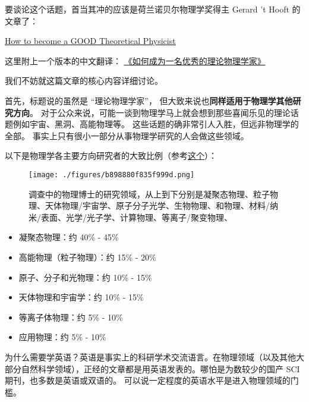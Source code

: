 
要谈论这个话题，首当其冲的应该是荷兰诺贝尔物理学奖得主 Gerard 't Hooft 的文章了：

\href{https://webspace.science.uu.nl/~hooft101/theorist.html}{How to become a GOOD Theoretical Physicist}

这里附上一个版本的中文翻译： \href{https://xialab.pku.edu.cn/kytdyw1/zdylm.m.jsp?wbtreeid=1011&tstreeid=11956&_t_uid=2945&language=en&homepageuuid=BF649325C5584FC683CE0B601D21AC65&templateuuid=4CC182410BA14FF8B55ED726FB2087FB&producttype=0&_tmode_=99&tsitesapptype=zdylm}{《如何成为一名优秀的理论物理学家》}

我们不妨就这篇文章的核心内容详细讨论。

首先，标题说的虽然是 “理论物理学家”， 但大致来说也\textbf{同样适用于物理学其他研究方向}。 对于公众来说，可能一谈到物理学马上就会想到那些喜闻乐见的理论话题例如宇宙、黑洞、高能物理等。 这些话题的确非常引人入胜，但远非物理学的全部。 事实上只有很小一部分从事物理学研究的人会做这些领域。 

以下是物理学各主要方向研究者的大致比例（参考\href{https://ww2.aip.org/statistics/trends-in-physics-phds}{这个}）：

\begin{figure}[ht]
\centering
\texttt{[image: ./figures/b898880f835f999d.png]}
\caption{调查中的物理博士的研究领域，从上到下分别是凝聚态物理、粒子物理、天体物理/宇宙学、原子分子光学、生物物理、和物理、材料/纳米/表面、光学/光子学、计算物理、等离子/聚变物理、} \label{fig_SdyPhy_1}
\end{figure}

\begin{itemize}
\item 凝聚态物理：约 40\% - 45\%
\item 高能物理（粒子物理）：约 15\% - 20\%
\item 原子、分子和光物理：约 10\% - 15\%
\item 天体物理和宇宙学：约 10\% - 15\%
\item 等离子体物理：约 5\% - 10\%
\item 应用物理：约 5\% - 10\%
\end{itemize}


为什么需要学英语？英语是事实上的科研学术交流语言。在物理领域（以及其他大部分自然科学领域），正经的文章都是用英语发表的。哪怕是为数较少的国产 SCI 期刊，也多数是英语或双语的。 可以说一定程度的英语水平是进入物理领域的门槛。


